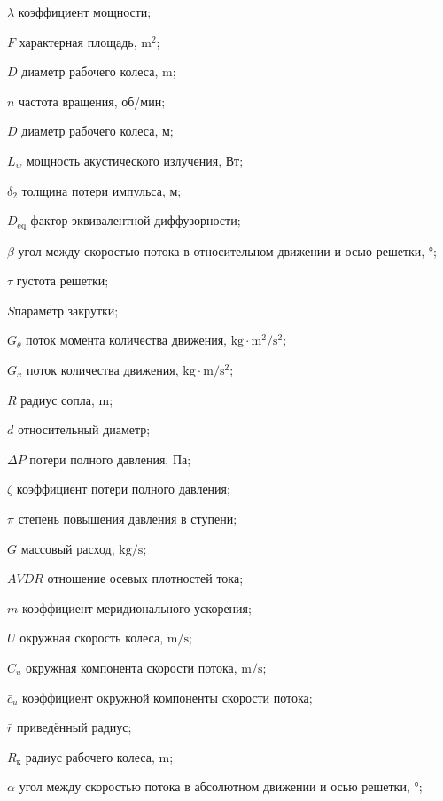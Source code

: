 \begin{eqexpl}
\item{\(\lambda\)} коэффициент мощности;
\item{\(F\)} характерная площадь, \(\si{\meter}^2\);
\item{\(D\)} диаметр рабочего колеса, \(\si\meter\);
\item{\(n\)} частота вращения, об/мин;
\item{\(D\)} диаметр рабочего колеса, м;
\item{\( L_w \)} мощность акустического излучения, Вт;
\item{$\delta_{2}$} толщина потери импульса, м;
\item{$D_\text{eq}$} фактор эквивалентной диффузорности;
\item{$\beta$} угол между скоростью потока в относительном движении и осью решетки, \(\si\degree\);
\item{$\tau$} густота решетки;
\item{$S$}параметр закрутки;
\item{\(G_\theta\)} поток момента количества движения, \(\si\kilogram \cdot \si\meter^2/\si\second^2\);
\item{\(G_x\)} поток количества движения, \(\si\kilogram \cdot \si\meter/\si\second^2\);
\item{\(R\)} радиус сопла, \(\si\meter\);
\item{$\bar{d}$} относительный диаметр;
\item{\(\Delta P\)} потери полного давления, Па;
\item{$\zeta$} коэффициент потери полного давления;
\item{\(\pi\)} степень повышения давления в ступени;
\item{\(G\)} массовый расход, \(\si\kilogram/\si\second\);
\item{\(AVDR\)} отношение осевых плотностей тока;
\item{\(m\)} коэффициент меридионального ускорения;
\item{\(U\)} окружная скорость колеса, \(\si\meter/\si\second\);
\item{\(C_{u}\)} окружная компонента скорости потока, \(\si\meter/\si\second\);
\item{\(\bar{c}_{u}\)} коэффициент окружной компоненты скорости потока;
\item{\(\bar{r}\)} приведённый радиус;
\item{\(R_\text{к}\)} радиус рабочего колеса, \(\si\meter\);
\item{$\alpha$} угол между скоростью потока в абсолютном движении и осью решетки, \(\si\degree\);

\end{eqexpl}
